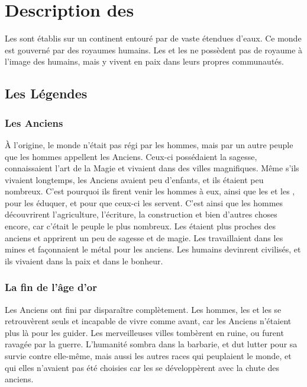 \documentclass[a4paper,10pt,openany]{book}
\begin{document}
\section{Description des \Royaumes}
Les \Royaumes sont établis sur un continent entouré par de vaste étendues d’eaux. Ce monde est gouverné par des royaumes humains. Les \Elfes et
les \Nains ne possèdent pas de royaume à l’image des humains, mais y vivent en paix dans leurs propres communautés.

\begin{multicols}{2}

\subsection{Les Légendes}

\subsubsection{Les Anciens}
À l’origine, le monde n’était pas régi par les hommes, mais par un autre peuple que les hommes appellent les Anciens. Ceux-ci possédaient la sagesse,
connaissaient l’art de la Magie et vivaient dans des villes magnifiques. Même s’ils vivaient longtemps, les Anciens avaient peu d’enfants, et ils
étaient peu nombreux. C’est pourquoi ils firent venir les hommes à eux, ainsi que les \Elfes et les \Nains, pour les éduquer, et pour que ceux-ci les
servent. C’est ainsi que les hommes découvrirent l’agriculture, l’écriture, la construction et bien d’autres choses encore, car c’était le peuple le
plus nombreux. Les \Elfes étaient plus proches des anciens et apprirent un peu de sagesse et de magie. Les \Nains travaillaient dans les mines et
façonnaient le métal pour les anciens. Les humains devinrent civilisés, et ils vivaient dans la paix et dans le bonheur.

\subsubsection{La fin de l’âge d’or}
Les Anciens ont fini par disparaître complètement. Les hommes, les \Elfes et les \Nains se retrouvèrent seuls et incapable de vivre comme avant, car les
Anciens n’étaient plus là pour les guider. Les merveilleuses villes tombèrent en ruine, ou furent ravagée par la guerre. L’humanité sombra dans la
barbarie, et dut lutter pour sa survie contre elle-même, mais aussi les autres races qui peuplaient le monde, et qui elles n’avaient pas été choisies
car les \DemiOrcs se développèrent avec la chute des anciens.


\end{multicols}
\end{document}
